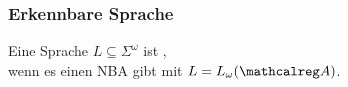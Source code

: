 \begin{frame}
\begin{exampleblock}{}
\begin{small}
        \par
        \end{small}
      \end{exampleblock}

    \end{frame}

    \begin{frame}
      \frametitle{Erkennbare Sprache}
      
      \begin{Definition}
        Eine Sprache $L \subseteq \Sigma^\omega$ ist , \\
        wenn es einen NBA  gibt mit $L = L_\omega(\Aut{A})$.
      \end{Definition}

    \end{frame}

  
